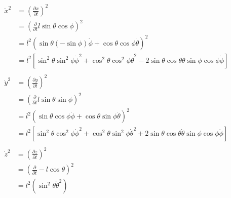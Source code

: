 \documentclass{scrartcl}
\begin{document}
\begin{align}
\begin{split}
\dot{x}^2& = (\frac{\partial x}{\partial t})^2			\\
& = (\frac{\partial }{\partial t} l \sin{\theta} \cos{\phi})^2	\\
& = l^2(\sin{\theta} (-\sin{\phi}) \dot{\phi} + \cos{\theta}\cos{\phi} \dot{\theta})^2				\\
& = l^2 [
	\sin^2\theta \sin^2 \phi \dot{\phi}^2 + 
	\cos^2\theta \cos^2\phi \dot{\theta}^2 -
	2 \sin\theta\cos\theta\dot{\theta}\sin{\phi}\cos\phi\dot{\phi}
	]
\end{split}
\\
\begin{split}
\dot{y}^2& = (\frac{\partial y}{\partial t})^2			\\
& = (\frac{\partial }{\partial t} l \sin{\theta} \sin{\phi})^2	\\
& = l^2(\sin{\theta} \cos\phi \dot{\phi} + \cos\theta\sin{\phi} \dot{\theta})^2				\\
& = l^2 [
	\sin^2\theta \cos^2 \phi \dot\phi^2 + 
	\cos^2\theta \sin^2\phi \dot{\theta}^2 + 
	2 \sin{\theta} \cos\theta \dot{\theta} \sin{\phi}\cos\phi \dot{\phi}
	]
\end{split}
\\
\begin{split}
\dot{z}^2& = (\frac{\partial z}{\partial t})^2			\\
& = (\frac{\partial }{\partial t} - l\cos{\theta} )^2	\\
& = l^2 ( \sin^2\theta \dot{\theta}^2 )
\end{split}
\end{align}
\end{document}

